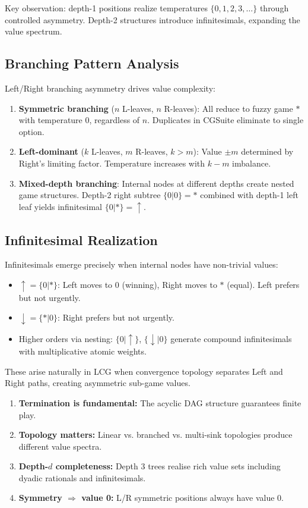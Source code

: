 \documentclass[10pt,a4paper,twocolumn]{article}
\theoremstyle{plain}
\theoremstyle{definition}
\theoremstyle{remark}
\begin{document}
Key observation: depth-1 positions realize temperatures $\{0, 1, 2, 3, \ldots\}$ through controlled asymmetry. Depth-2 structures introduce infinitesimals, expanding the value spectrum.

\subsection{Branching Pattern Analysis}

Left/Right branching asymmetry drives value complexity:

\begin{enumerate}
\item \textbf{Symmetric branching} ($n$ L-leaves, $n$ R-leaves): All reduce to fuzzy game $*$ with temperature 0, regardless of $n$. Duplicates in CGSuite eliminate to single option.
\item \textbf{Left-dominant} ($k$ L-leaves, $m$ R-leaves, $k > m$): Value $\pm m$ determined by Right's limiting factor. Temperature increases with $k-m$ imbalance.
\item \textbf{Mixed-depth branching}: Internal nodes at different depths create nested game structures. Depth-2 right subtree $\{0|0\} = *$ combined with depth-1 left leaf yields infinitesimal $\{0|*\} = \uparrow$.
\end{enumerate}

\subsection{Infinitesimal Realization}

Infinitesimals emerge precisely when internal nodes have non-trivial values:

\begin{itemize}
\item $\uparrow = \{0|*\}$: Left moves to 0 (winning), Right moves to $*$ (equal). Left prefers but not urgently.
\item $\downarrow = \{*|0\}$: Right prefers but not urgently.
\item Higher orders via nesting: $\{0|\uparrow\}$, $\{\downarrow|0\}$ generate compound infinitesimals with multiplicative atomic weights.
\end{itemize}

These arise naturally in LCG when convergence topology separates Left and Right paths, creating asymmetric sub-game values.

\begin{enumerate}
\item \textbf{Termination is fundamental:} The acyclic DAG structure guarantees finite play.
\item \textbf{Topology matters:} Linear vs. branched vs. multi-sink topologies produce different value spectra.
\item \textbf{Depth-$d$ completeness:} Depth 3 trees realise rich value sets including dyadic rationals and infinitesimals.
\item \textbf{Symmetry $\Rightarrow$ value 0:} L/R symmetric positions always have value 0.
\end{enumerate}
\end{document}
